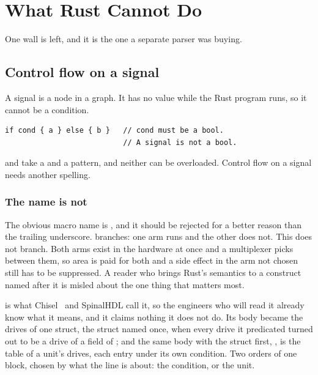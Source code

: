 \section{What Rust Cannot Do}
\label{sec:e-walls}

One wall is left, and it is the one a separate parser was buying.

\subsection{Control flow on a signal}

A signal is a node in a graph. It has no value while the Rust program
runs, so it cannot be a condition.

\begin{lstlisting}[caption={The wall. A signal has no value while the program runs, so it cannot be a condition.},label={lst:wall}]
if cond { a } else { b }   // cond must be a bool.
                           // A signal is not a bool.
\end{lstlisting}

 and  take a  and a pattern, and neither
can be overloaded. Control flow on a signal needs another spelling.

\subsubsection{The name is not }

The obvious macro name is , and it should be rejected for a
better reason than the trailing underscore.  branches: one arm
runs and the other does not. This does not branch. Both arms exist in the
hardware at once and a multiplexer picks between them, so area is paid for
both and a side effect in the arm not chosen still has to be suppressed. A
reader who brings Rust's  semantics to a construct named after it
is misled about the one thing that matters most.

 is what Chisel~\cite{bachrach2012} and SpinalHDL call
it, so the engineers who will read it already know what it means, and
it claims nothing it does not do. Its body became the drives of one
struct, the struct named once, when every drive it predicated turned
out to be a drive of a field of ; and the same body with
the struct first, , is the table of a
unit's drives, each entry under its own condition. Two orders of one
block, chosen by what the line is about: the condition, or the unit.

